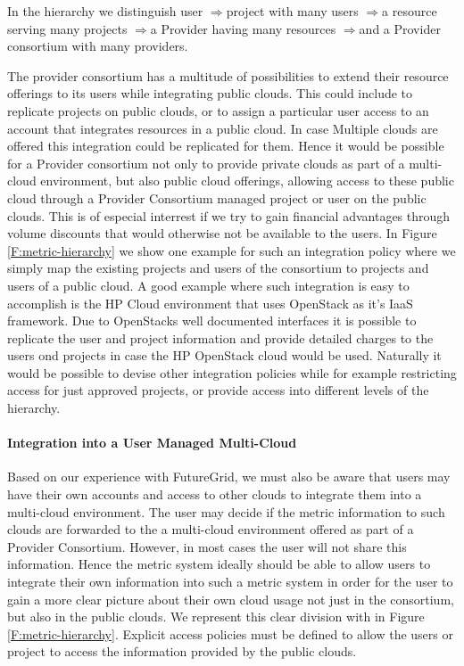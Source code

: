 \documentclass{tex/sig-alternate-2013}
\newcommand{\todo}[1]{{\color{red}{#1}}}
\begin{document}
{\newcommand{\ARROW}{$\Rightarrow$}

\todo{READ}

In the hierarchy we distinguish user \ARROW project with many users
\ARROW a resource serving many projects \ARROW a Provider having many
resources \ARROW and a Provider consortium with many providers. 

The provider consortium has a multitude of possibilities to extend
their resource offerings to its users while integrating public
clouds. This could include to replicate projects on public clouds, or
to assign a particular user access to an account that integrates
resources in a public cloud. In case Multiple clouds are offered this
integration could be replicated for them. Hence it would be possible
for a Provider consortium not only to provide private clouds as part
of a multi-cloud environment, but also public cloud offerings, allowing
access to these public cloud through a Provider Consortium managed
project or user on the public clouds. This is of especial interrest if
we try to gain financial advantages through volume discounts that
would otherwise not be available to the users. 
In Figure \ref{F:metric-hierarchy} we show one example for such an
integration policy where we simply map the existing projects and users
of the consortium to projects and users of a public cloud. A good
example where such integration is easy to accomplish is the HP Cloud
environment that uses OpenStack as it's IaaS framework. Due to
OpenStacks well documented interfaces it is possible to replicate the
user and project information and provide detailed charges to the users
ond projects in case the HP OpenStack cloud would be used. Naturally
it would be possible to devise other integration policies while for
example restricting access for just approved projects, or provide
access into different levels of the hierarchy.

\paragraph{Integration into a User Managed Multi-Cloud}

\todo{READ}

Based on our experience with FutureGrid, we must also be aware that
users may have their own accounts and access to other clouds to
integrate them into a multi-cloud environment. The user may decide if
the metric information to such clouds are forwarded to the a
multi-cloud environment offered as part of a Provider
Consortium. However, in most cases the user will not share this
information. Hence the metric system ideally should be able to allow
users to integrate their own information into such a metric system in
order for the user to gain a more clear picture about their own
cloud usage not just in the consortium, but also in the public
clouds. We represent this clear division with in Figure
\ref{F:metric-hierarchy}. Explicit access policies must be defined to
allow the users or project to access the information provided by the
public clouds.


}
\end{document}
